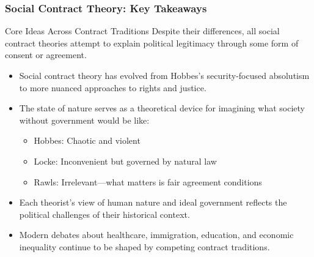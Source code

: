 \documentclass[aspectratio=169]{beamer}
\begin{document}
\begin{frame}
  \frametitle{Social Contract Theory: Key Takeaways}
  
  \begin{block}{Core Ideas Across Contract Traditions}
    Despite their differences, all social contract theories attempt to explain political legitimacy through some form of consent or agreement.
  \end{block}
  
  \begin{itemize}
    \item Social contract theory has evolved from Hobbes's security-focused absolutism to more nuanced approaches to rights and justice.
    \item The state of nature serves as a theoretical device for imagining what society without government would be like:
      \begin{itemize}
        \item Hobbes: Chaotic and violent
        \item Locke: Inconvenient but governed by natural law
        \item Rawls: Irrelevant—what matters is fair agreement conditions
      \end{itemize}
    \item Each theorist's view of human nature and ideal government reflects the political challenges of their historical context.
    \item Modern debates about healthcare, immigration, education, and economic inequality continue to be shaped by competing contract traditions.

  \end{itemize}
\end{frame}
\end{document}

